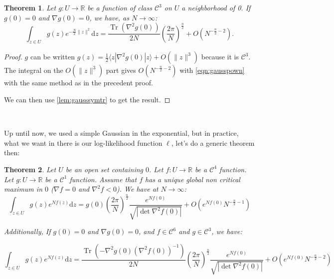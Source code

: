 \documentclass[10pt,a4paper]{report}
\theoremstyle{plain}
\newtheorem{thm}{Theorem}[chapter]
\theoremstyle{definition}
\theoremstyle{remark}
\newcommand{\R}{\ensuremath{\mathbb{R}}}
\newcommand{\ket}[1]{|#1\rangle}
\newcommand{\bra}[1]{\langle#1|}
\newcommand{\dd}{\mathrm{d}}
\DeclareMathOperator{\Tr}{Tr}
\newcommand{\class}[1]{{\mathscr{C}^{#1}}}
\begin{document}
\begin{thm}\label{thm:asy2}
 Let $g : U \to \R$ be a function of class $\class 3$ on $U$ a neighborhood of 0. If $g(0) = 0$
 and $\nabla g(0) = 0$, we have, as $N \to \infty$:
  \[\int_{z \in U} g(z)e^{-\frac N2\|z\|^2} \dd z = \frac{\Tr(\nabla^2 g(0))}{2N} {\left(\frac
        {2\pi}{N}\right)}^{\frac n 2} +
    O\left({N^{-\frac n 2 -2}}\right).\]
\end{thm}

\begin{proof}
  $g$ can be written $g(z) = \frac12\bra z \nabla^2 g(0) \ket z + O(\|z\|^3)$ because it
  is $\class 3$. The integral on the $O(\|z\|^3)$ part gives $O\left({N^{-\frac
        n 2 -2}}\right)$ with \cref{eqn:gausspown} with the same method as in
  the precedent proof.

  We can then use \cref{lem:gausssymtr} to get the result.
\end{proof}

\

Up until now, we used a simple Gaussian in the exponential, but in practice,
what we want in there is our log-likelihood function $\ell$, let's do a generic
theorem then:

\begin{thm}\label{thm:asymid}
  Let $U$ be an open set containing $0$. Let $f : U \to \R$ be a $\class 4$ function.
  Let $g : U \to \R$ be a $\class 1$ function.
  Assume that $f$ has a unique global non critical maximum in $0$
  ($\nabla f = 0$ and $\nabla^2 f < 0$). We have at $N \to \infty$:
  \[\int_{z \in U} g(z)e^{Nf(z)} \dd z = g(0)
    {\left(\frac {2\pi}{N}\right)}^{\frac n 2}
    \frac {e^{Nf(0)}}{\sqrt{\left|\det \nabla^2 f(0)\right|}}
    + O(e^{Nf(0)} N^{-\frac n 2 -1})\]

  Additionally, If $g(0) = 0$ and $\nabla g(0) = 0$, and $f \in \class 6$ and $g
  \in \class 3$, we have:

  \[\int_{z \in U} g(z)e^{N f(z)} \dd z =
    \frac{\Tr\left(-\nabla^2 g(0) {\left(\nabla^2 f(0)\right)}^{-1}\right)}{2N}
    {\left(\frac {2\pi}{N}\right)}^{\frac n 2}
    \frac {e^{Nf(0)}}{\sqrt{\left|\det \nabla^2 f(0)\right|}}
    + O\left(e^{Nf(0)}{N^{-\frac n 2 -2}}\right)\]
\end{thm}
\end{document}
